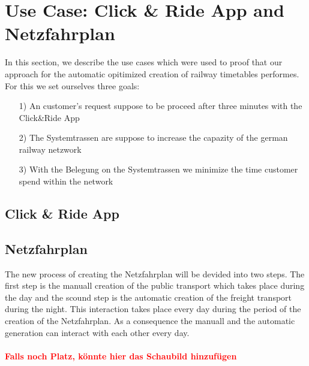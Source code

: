 \section{Use Case: Click \& Ride App and Netzfahrplan}
\label{chap:useCases}
In this section, we describe the use cases which were used to proof that our approach for the automatic opitimized creation of railway timetables performes. For this we set ourselves three goals: 

\begin{itemize}
	\item[1)] An customer's request suppose to be proceed after three minutes with the Click\&Ride App
	\item[2)] The Systemtrassen are suppose to increase the capazity of the german railway netzwork
	\item[3)] With the Belegung on the Systemtrassen we minimize the time customer spend within the network
\end{itemize}

\subsection{Click \& Ride App}
\label{chap:CnR}

\subsection{Netzfahrplan}
\label{chap:Netzfahrplan}
The new process of creating the Netzfahrplan will be devided into two steps. The first step is the manuall creation of the 
public transport which takes place during the day and the scound step is the automatic creation of the freight transport during the night. This interaction takes place every day during the period of the creation of the Netzfahrplan. As a consequence the manuall and the automatic generation can interact with each other every day. \\
\\
\textbf{\textcolor{red}{Falls noch Platz, könnte hier das Schaubild hinzufügen}}


